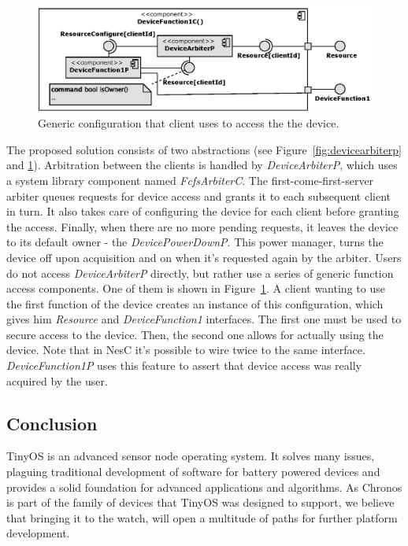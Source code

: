 \begin{figure}[h]
  \centering
  \includegraphics[width=1.0\textwidth]{diagrams/devicefunction1c.eps}
  \caption{Generic configuration that client uses to access the
  the device.}
  \label{fig:devicefunction1}
\end{figure}
The proposed solution consists of two abstractions (see Figure~\ref{fig:devicearbiterp} and \ref{fig:devicefunction1}). Arbitration between the clients is handled by \emph{DeviceArbiterP}, which uses a system library component named \emph{FcfsArbiterC}. The first-come-first-server arbiter queues requests for device access and grants it to each subsequent client in turn. It also takes care of configuring the device for each client before granting the access. Finally, when there are no more pending requests, it leaves the device to its default owner - the \emph{DevicePowerDownP}. This power manager, turns the device off upon acquisition and  on when it's requested again by the arbiter. Users do not access \emph{DeviceArbiterP} directly, but rather use a series of generic function access components. One of them is shown in Figure~\ref{fig:devicefunction1}.
A client wanting to use the first function of the device creates an instance of this configuration, which gives him \emph{Resource} and \emph{DeviceFunction1} interfaces. The first one must be used to secure access to the device.  Then, the second one allows for actually using the device.  Note that in NesC it's possible to wire twice to the same interface.  \emph{DeviceFunction1P} uses this feature to assert that device access was really acquired by the user.

\subsection{Conclusion}
TinyOS is an advanced sensor node operating system. It solves many issues, plaguing traditional development of software for battery powered devices and provides a solid foundation for advanced applications and algorithms. As Chronos is part of the family of devices that TinyOS was designed to support, we believe that bringing it to the watch, will open a multitude of paths for further platform development.



